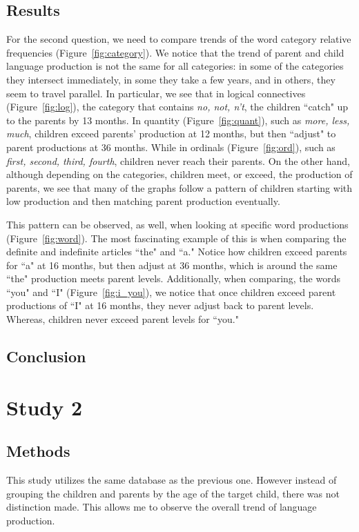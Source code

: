 \documentclass{article}
\theoremstyle{plain}
\theoremstyle{definition}
\theoremstyle{remark}
\numberwithin{equation}{section}
\begin{document}
\subsection{Results}
For the second question, we need to compare trends of the word category relative frequencies (Figure~\ref{fig:category}). We notice that the trend of parent and child language production is not the same for all categories: in some of the categories they intersect immediately, in some they take a few years, and in others, they seem to travel parallel. In particular, we see that in logical connectives (Figure~\ref{fig:log}), the category that contains \emph{no, not, n’t}, the children ``catch" up to the parents by 13 months. In quantity (Figure~\ref{fig:quant}), such as \emph{more, less, much}, children exceed parents' production at 12 months, but then ``adjust" to parent productions at 36 months. While in ordinals (Figure~\ref{fig:ord}), such as \emph{first, second, third, fourth}, children never reach their parents. On the other hand, although depending on the categories, children meet, or exceed, the production of parents, we see that many of the graphs follow a pattern of children starting with low production and then matching parent production eventually. 

This pattern can be observed, as well, when looking at specific word productions (Figure~\ref{fig:word}). The most fascinating example of this is when comparing the definite and indefinite articles ``the" and ``a." Notice how children exceed parents for ``a" at 16 months, but then adjust at 36 months, which is around the same ``the" production meets parent levels. Additionally, when comparing, the words ``you" and ``I" (Figure~\ref{fig:i_you}), we notice that once children exceed parent productions of ``I" at 16 months, they never adjust back to parent levels. Whereas, children never exceed parent levels for ``you."

\subsection{Conclusion}
\section{Study 2}

\subsection{Methods}
This study utilizes the same database as the previous one. However instead of grouping the children and parents by the age of the target child, there was not distinction made. This allows me to observe the overall trend of language production. 
\end{document}
